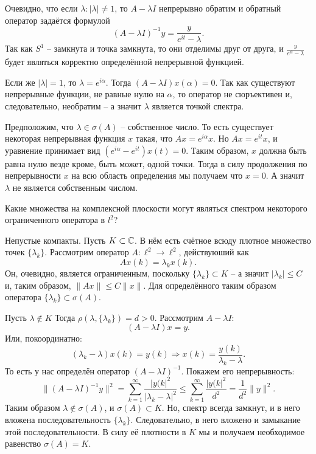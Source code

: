 \begin{solution}
    Очевидно, что если $\lambda\colon |\lambda| \neq 1$, то $A - \lambda I$ непрерывно обратим и обратный оператор задаётся формулой
    \[
        (A - \lambda I)^{-1}y = \frac{y}{e^{it} - \lambda}.
    \]
    Так как $S^1$ -- замкнута и точка замкнута, то они отделимы друг от друга, и $\frac{y}{e^{it} - \lambda}$ будет являться корректно определённой непрерывной функцией.

    Если же $|\lambda| = 1$, то $\lambda = e^{i\alpha}$.
    Тогда $(A - \lambda I)x(\alpha) = 0$.
    Так как существуют непрерывные функции, не равные нулю на $\alpha$, то оператор не сюръективен и, следовательно, необратим -- а значит $\lambda$ является точкой спектра.

    Предположим, что $\lambda \in \sigma(A)$ -- собственное число.
    То есть существует некоторая непрерывная функция $x$ такая, что $Ax = e^{i\alpha} x$.
    Но $Ax = e^{it}x$, и уравнение принимает вид $(e^{i\alpha} - e^{it})x(t) = 0$. 
    Таким образом, $x$ должна быть равна нулю везде кроме, быть может, одной точки. Тогда в силу продолжения по непрерывности $x$ на всю область определения мы получаем что $x = 0$.
    А значит $\lambda$ не является собственным числом.
\end{solution}
\begin{task}[7.13]
    Какие множества на комплексной плоскости могут являться спектром некоторого ограниченного оператора в $l^2$?
\end{task}
\begin{solution}
    Непустые компакты.
    Пусть $K \subset \mathbb{C}$.
    В нём есть счётное всюду плотное множество точек $\{\lambda_k\}$.
    Рассмотрим оператор $A\colon \ell^2 \to \ell^2$, действуюший как 
    \[
        Ax(k) = \lambda_k x(k).
    \]
    Он, очевидно, является ограниченным, поскольку $\{\lambda_k\} \subset K$ -- а значит $|\lambda_k| \leq C$ и, таким образом, $\|Ax\| \leq C\|x\|$.
    Для определённого таким образом оператора $\{\lambda_k\} \subset \sigma(A)$.

    Пусть $\lambda \notin K$
    Тогда $\rho(\lambda, \{\lambda_k\}) = d > 0$.
    Рассмотрим $A - \lambda I\colon$
    \[
        (A - \lambda I)x = y.
    \]  
    Или, покоординатно:
    \[
        (\lambda_k - \lambda)x(k) = y(k) \Rightarrow x(k) = \frac{y(k)}{\lambda_k - \lambda}.
    \]
    То есть у нас определён оператор $(A - \lambda I)^{-1}$.
    Покажем его непрерывность:
    \[
        \|(A - \lambda I)^{-1}y\|^2 = \sum_{k = 1}^{\infty} \frac{|y(k|^2}{|\lambda_k - \lambda|^2} \leq \sum_{k = 1}^{\infty} \frac{|y(k|^2}{d^2} = \frac{1}{d^2}\|y\|^2.
    \]
    Таким образом $\lambda \notin \sigma(A)$, и $\sigma(A) \subset K$.
    Но, спектр всегда замкнут, и в него вложена последовательность $\{\lambda_k\}$.
    Следовательно, в него вложено и замыкание этой последовательности.
    В силу её плотности в $K$ мы и получаем необходимое равенство $\sigma(A) = K$.
\end{solution}
